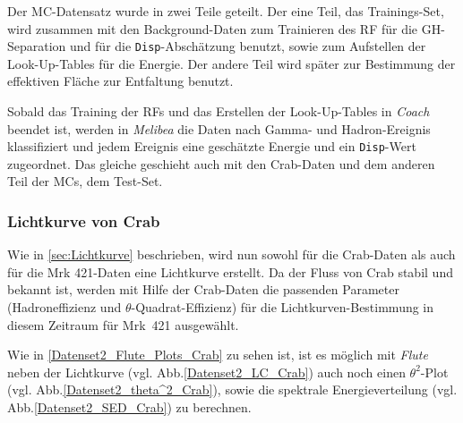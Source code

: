 Der MC-Datensatz wurde in zwei Teile geteilt.
Der eine Teil, das Trainings-Set, wird zusammen mit den Background-Daten zum Trainieren des RF für die GH-Separation und für die \texttt{Disp}-Abschätzung benutzt, sowie zum Aufstellen der Look-Up-Tables für die Energie.
Der andere Teil wird später zur Bestimmung der effektiven Fläche zur Entfaltung benutzt.

Sobald das Training der RFs und das Erstellen der Look-Up-Tables in \textit{Coach} beendet ist, werden in \textit{Melibea} die Daten nach Gamma- und Hadron-Ereignis klassifiziert und jedem Ereignis eine geschätzte Energie und ein \texttt{Disp}-Wert zugeordnet.
Das gleiche geschieht auch mit den Crab-Daten und dem anderen Teil der MCs, dem Test-Set.


\subsubsection{Lichtkurve von Crab}
Wie in \autoref{sec:Lichtkurve} beschrieben, wird nun sowohl für die Crab-Daten als auch für die Mrk 421-Daten eine Lichtkurve erstellt.
Da der Fluss von Crab stabil und bekannt ist, werden mit Hilfe der Crab-Daten die passenden Parameter (Hadroneffizienz und $\theta$-Quadrat-Effizienz) für die Lichtkurven-Bestimmung in diesem Zeitraum für Mrk~421 ausgewählt.

Wie in \autoref{Datenset2_Flute_Plots_Crab} zu sehen ist, ist es möglich mit \textit{Flute} neben der Lichtkurve (vgl. Abb.\ref{Datenset2_LC_Crab}) auch noch einen $\theta^2$-Plot (vgl. Abb.\ref{Datenset2_theta^2_Crab}), sowie die spektrale Energieverteilung (vgl. Abb.\ref{Datenset2_SED_Crab}) zu berechnen.

